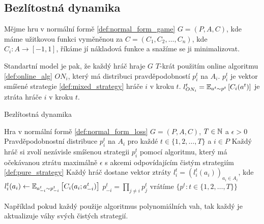 \subsection{Bezlítostná dynamika}
\begin{definition}
\label{def:normal_form_loss}
Mějme hru v normální formě \ref{def:normal_form_game} $G = (P,A,C)$, kde máme užitkovou funkci vyměněnou za $C = (C_1,C_2,\dots,C_n)$, kde $C_i: A \rightarrow [-1,1]$, říkáme jí nákladová funkce a snažíme se ji minimalizovat. 
\end{definition}
Standartní model je pak, že každý hráč hraje $G$ $T$-krát použitím online algoritmu \ref{def:online_alg} $ON_i$, který má distribuci pravděpodobností $p^t_i$ na $A_i$. 
$p^t_i$ je vektor smíšené strategie \ref{def:mixed_strategy} hráče $i$ v kroku $t$. 
$l^t_{ON_i} = \E[a^t \sim p^t]{C_i(a^t)}$ je ztráta hráče $i$ v kroku $t$. 

\begin{algorithm}
    \algrenewcommand{}
    \algrenewcommand{}
    \caption{Bezlítostná dynamika}
    \label{alg:no_regrets}
    \begin{algorithmic}[1]
        \Require Hra v normální formě \ref{def:normal_form_loss} $G= (P,A,C)$, $T\in \N$ a $\epsilon >0$
        \Ensure Pravděpodobnostní distribuce $p^t_i$ na $A_i$ pro každé $t \in \{1,2,\dots, T\}$ a $i \in P$ 
            \State Každý hráč si zvolí nezávisle smíšenou strategii $p^t_i$ pomocí algoritmu, který má očekávanou ztrátu maximálně $\epsilon$ s akcemi odpovídajícím čistým strategiím \ref{def:pure_strategy}
            \State Každý hráč dostane vektor ztráty $l^t_i = (l_i^t(a_i))_{a_i \in A_i}$, kde $l^t_i(a_i) \leftarrow \E[a_{-i}^t \sim p_{-i}^t]{C_i(a_i;a^t_{-i})}$
            \State $p^t_{-i} = \prod_{j \neq i} p_j^t$
        \EndFor
        \State vrátíme $\{p^t: t\in \{1,2,\dots,T\}\}$
    \end{algorithmic}
\end{algorithm}
Například pokud každý použije algoritmus polynomiálních vah, tak každý je aktualizuje váhy svých čistých strategií. 

